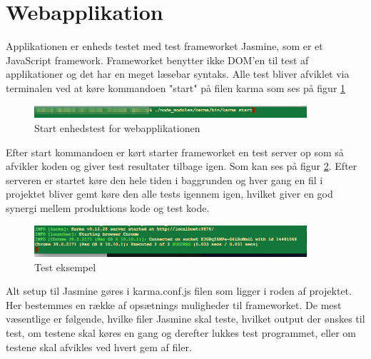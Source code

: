 \section{Webapplikation}
Applikationen er enheds testet med test frameworket Jasmine, som er et JavaScript framework. Frameworket benytter ikke DOM'en til test af applikationer og det har en meget læsebar syntaks. Alle test bliver afviklet via terminalen ved at køre kommandoen "start" på filen karma som ses på figur \ref{fig:run_test}

\begin{figure}[H]
	\centering
	\includegraphics[width=0.9\textwidth]{Billeder/Test/run_test.png}
	\vspace{-0.0cm}
	\caption{Start enhedstest for webapplikationen}
	\label{fig:run_test}
\end{figure}

Efter start kommandoen er kørt starter frameworket en test server op som så afvikler koden og giver test resultater tilbage igen. Som kan ses på figur \ref{fig:test_eksempel}. Efter serveren er startet køre den hele tiden i baggrunden og hver gang en fil i projektet bliver gemt køre den alle tests igennem igen, hvilket giver en god synergi mellem produktions kode og test kode.  

\begin{figure}[H]
	\centering
	\includegraphics[width=0.9\textwidth]{Billeder/Test/test_exampel.png}
	\vspace{-0.0cm}
	\caption{Test eksempel}
	\label{fig:test_eksempel}
\end{figure}

Alt setup til Jasmine gøres i karma.conf.js filen som ligger i roden af projektet. Her bestemmes en række af opsætnings muligheder til frameworket. De mest væsentlige er følgende, hvilke filer Jasmine skal teste, hvilket output der ønskes til test, om testene skal køres en gang og derefter lukkes test programmet, eller om testene skal afvikles ved hvert gem af filer. 